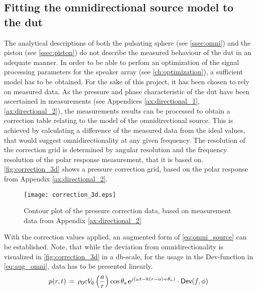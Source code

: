 \subsection{Fitting the omnidirectional source model to the \gls{dut}}\label{sec:correction}
The analytical descriptions of both the pulsating sphere (see \autoref{ssec:omni}) and the piston (see \autoref{ssec:piston}) do not describe the measured behaviour of the \gls{dut} in an adequate manner. In order to be able to perfom an optimization of the signal processing parameters for the speaker array (see \autoref{ch:optimization}), a sufficient model has to be obtained. For the sake of this project, it has been chosen to rely on measured data.
As the pressure and phase characteristic of the \gls{dut} have been ascertained in measurements (see Appendices \ref{ax:directional_1},\ref{ax:directional_2}), the measurements results can be processed to obtain a correction table relating to the model of the omnidirectional source. This is achieved by calculating a difference of the measured data from the ideal values, that would suggest omnidirectionality at any given frequency. The resolution of the correction grid is determined by angular resolution and the frequency resolution of the polar response measurement, that it is based on.  \autoref{fig:correction_3d} shows a pressure correction grid, based on the polar response from Appendix \ref{ax:directional_2}.
\begin{figure}[H]
	\centering
	\texttt{[image: correction\_3d.eps]}
	\caption{Contour plot of the pressure correction data, based on measurement data from Appendix \ref{ax:directional_2}}
		\label{fig:correction_3d}
\end{figure}
With the correction values applied, an augmented form of \autoref{eq:omni_source} can be established. Note, that while the deviation from omnidirectionality is visualized in \autoref{fig:correction_3d} in a \si{\decibel}-scale, for the usage in the \textsf{Dev}-function in \autoref{eq:aug_omni}, data has to be presented linearly.
\begin{equation}\label{eq:aug_omni}
p(r,t)\,=\,\rho_0 c V_0 \left(\frac{a}{r}\right)\cos \theta_a \textbf{\textit{e}}^{j\left(\omega t - k(r-a)+\theta_a\right)}\cdot\textsf{Dev}(f,\phi)
\end{equation}
\startexplain
{}
